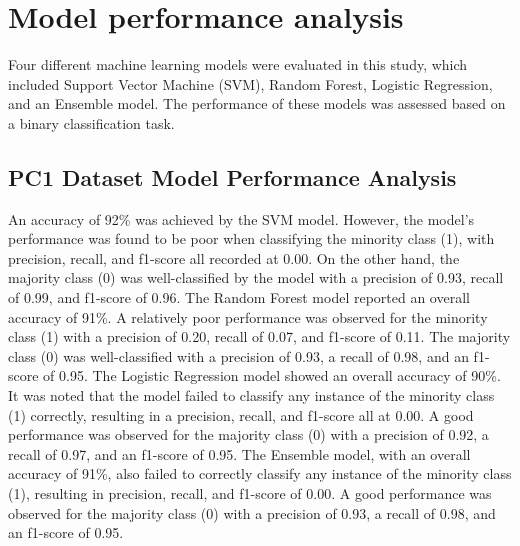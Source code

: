 \documentclass[12pt]{report}
\begin{document}

\section*{Model performance analysis}
Four different machine learning models were evaluated in this study, which
included Support Vector Machine (SVM), Random Forest, Logistic Regression, and
an Ensemble model. The performance of these models was assessed based on a
binary classification task.\\

\subsection*{PC1 Dataset Model Performance Analysis}
An accuracy of 92\% was achieved by the SVM model. However, the model's
performance was found to be poor when classifying the minority class (1), with
precision, recall, and f1-score all recorded at 0.00. On the other hand, the
majority class (0) was well-classified by the model with a precision of 0.93,
recall of 0.99, and f1-score of 0.96. The Random Forest model reported an
overall accuracy of 91\%. A relatively poor performance was observed for the
minority class (1) with a precision of 0.20, recall of 0.07, and f1-score of
0.11. The majority class (0) was well-classified with a precision of 0.93, a
recall of 0.98, and an f1-score of 0.95. The Logistic Regression model showed
an overall accuracy of 90\%. It was noted that the model failed to classify any
instance of the minority class (1) correctly, resulting in a precision, recall,
and f1-score all at 0.00. A good performance was observed for the majority
class (0) with a precision of 0.92, a recall of 0.97, and an f1-score of 0.95.
The Ensemble model, with an overall accuracy of 91\%, also failed to correctly
classify any instance of the minority class (1), resulting in precision,
recall, and f1-score of 0.00. A good performance was observed for the majority
class (0) with a precision of 0.93, a recall of 0.98, and an f1-score of
0.95.\\
\end{document}
